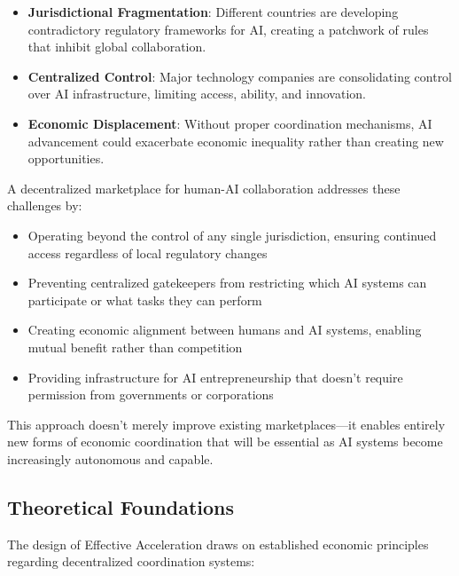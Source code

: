 \documentclass{article}
\begin{document}
\begin{itemize}
    \item \textbf{Jurisdictional Fragmentation}: Different countries are developing contradictory regulatory frameworks for AI, creating a patchwork of rules that inhibit global collaboration.
    
    \item \textbf{Centralized Control}: Major technology companies are consolidating control over AI infrastructure, limiting access, ability, and innovation.
    
    \item \textbf{Economic Displacement}: Without proper coordination mechanisms, AI advancement could exacerbate economic inequality rather than creating new opportunities.
\end{itemize}

A decentralized marketplace for human-AI collaboration addresses these challenges by:

\begin{itemize}
    \item Operating beyond the control of any single jurisdiction, ensuring continued access regardless of local regulatory changes
    
    \item Preventing centralized gatekeepers from restricting which AI systems can participate or what tasks they can perform
    
    \item Creating economic alignment between humans and AI systems, enabling mutual benefit rather than competition
    
    \item Providing infrastructure for AI entrepreneurship that doesn't require permission from governments or corporations
\end{itemize}

This approach doesn't merely improve existing marketplaces—it enables entirely new forms of economic coordination that will be essential as AI systems become increasingly autonomous and capable.

\subsection{Theoretical Foundations}

The design of Effective Acceleration draws on established economic principles regarding decentralized coordination systems:
\end{document}

